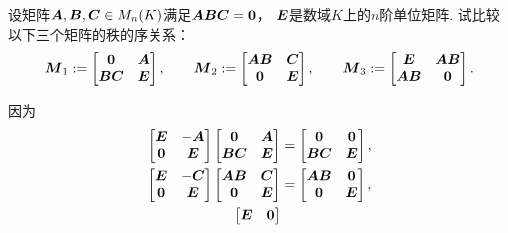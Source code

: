 \begin{example}
设矩阵\(\boldsymbol{A},\boldsymbol{B},\boldsymbol{C} \in M_n(K)\)满足\(\boldsymbol{A} \boldsymbol{B} \boldsymbol{C} = \boldsymbol0\)，
\(\boldsymbol{E}\)是数域\(K\)上的\(n\)阶单位矩阵.
试比较以下三个矩阵的秩的序关系：\begin{equation*}
	\boldsymbol{M}_1 := \begin{bmatrix}
		\boldsymbol0 & \boldsymbol{A} \\
		\boldsymbol{B} \boldsymbol{C} & \boldsymbol{E}
	\end{bmatrix},
	\qquad
	\boldsymbol{M}_2 := \begin{bmatrix}
		\boldsymbol{A} \boldsymbol{B} & \boldsymbol{C} \\
		\boldsymbol0 & \boldsymbol{E}
	\end{bmatrix},
	\qquad
	\boldsymbol{M}_3 := \begin{bmatrix}
		\boldsymbol{E} & \boldsymbol{A} \boldsymbol{B} \\
		\boldsymbol{A} \boldsymbol{B} & \boldsymbol0
	\end{bmatrix}.
\end{equation*}
\begin{solution}
因为\begin{align*}
	\begin{bmatrix}
		\boldsymbol{E} & -\boldsymbol{A} \\
		\boldsymbol0 & \boldsymbol{E}
	\end{bmatrix}
	\begin{bmatrix}
		\boldsymbol0 & \boldsymbol{A} \\
		\boldsymbol{B} \boldsymbol{C} & \boldsymbol{E}
	\end{bmatrix}
	&= \begin{bmatrix}
		\boldsymbol0 & \boldsymbol0 \\
		\boldsymbol{B} \boldsymbol{C} & \boldsymbol{E}
	\end{bmatrix}, \\
	\begin{bmatrix}
		\boldsymbol{E} & -\boldsymbol{C} \\
		\boldsymbol0 & \boldsymbol{E}
	\end{bmatrix}
	\begin{bmatrix}
		\boldsymbol{A} \boldsymbol{B} & \boldsymbol{C} \\
		\boldsymbol0 & \boldsymbol{E}
	\end{bmatrix}
	&= \begin{bmatrix}
		\boldsymbol{A} \boldsymbol{B} & \boldsymbol0 \\
		\boldsymbol0 & \boldsymbol{E}
	\end{bmatrix}, \\
	\begin{bmatrix}
		\boldsymbol{E} & \boldsymbol0 \\

\end{bmatrix}
\end{align*}
\end{solution}
\end{example}

